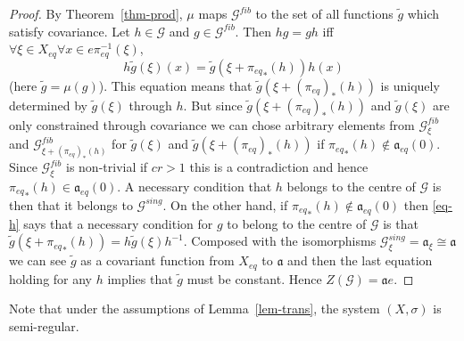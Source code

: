 \documentclass[10pt,a4paper]{amsart}
\numberwithin{equation}{section}
\newcommand{\Gg}{{\mathcal G}}
\newcommand{\Xe}{X_{eq}}
\newcommand{\aut}{{\mathfrak a}}
\newcommand{\aute}{\aut_{eq}}
\newcommand{\pe}{\pi_{eq}}
\newcommand{\Gf}{\Gg^{fib}}
\begin{document}
\begin{proof}
By Theorem~\ref{thm-prod}, $\mu$ maps $\Gf$ to the set of  
all functions $\tilde g$ which satisfy covariance. 
Let $h\in \Gg$ and $g\in \Gf$. Then $h g = g h$ iff 
$\forall \xi\in \Xe \forall x\in e\pe^{-1}(\xi)$, 
\begin{equation}\label{eq-h} 
h \tilde g(\xi)(x) =\tilde g(\xi+{\pe}_*(h)) h(x)
\end{equation} 
(here $\tilde g = \mu(g)$).
This equation means that $\tilde g(\xi+(\pe)_*(h))$ is uniquely determined by $\tilde g(\xi)$ through $h$. But since  $\tilde g(\xi+(\pe)_*(h))$ and $\tilde g(\xi)$ are only constrained through covariance we can chose arbitrary elements from $\Gf_\xi$ and $\Gf_{\xi+(\pe)_*(h)}$ for   $\tilde g(\xi)$ and $\tilde g(\xi+(\pe)_*(h))$ if ${\pe}_*(h)\notin \aute (0)$. Since $\Gf_\xi$ is non-trivial if $cr>1$ this is a contradiction and hence 
${\pe}_*(h)\in \aute (0)$. A necessary condition that $h$ belongs to the centre of $\Gg$ is then that it belongs to $\Gg^{sing}$.  
On the other hand, if ${\pe}_*(h)\notin \aute (0)$ then  \eqref{eq-h} says that a necessary condition for $g$ to belong to the centre of $\Gg$ is that 
$\tilde g(\xi+{\pe}_*(h))=h\tilde g(\xi)h^{-1}$. Composed with the isomorphisms $\Gg^{sing}_\xi=\aut_\xi\cong\aut$ we can see $\tilde g$ as a covariant function from $\Xe$ to $\aut$ and then the last equation holding for any $h$ implies that $\tilde g$ must be constant. Hence $Z(\Gg)=\aut e$.
\end{proof}
Note that under the assumptions of Lemma~\ref{lem-trans},  the system $(X,\sigma)$ is semi-regular.
 
\end{document}
